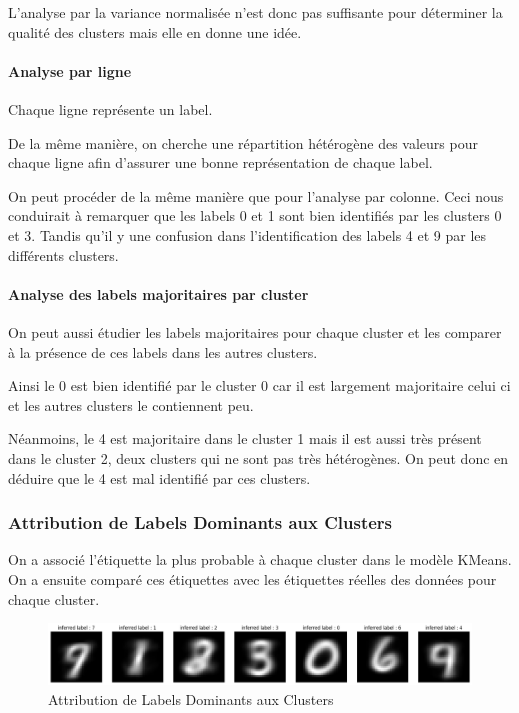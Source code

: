 \documentclass[french,a4paper,18pt]{article}
\begin{document}
L'analyse par la variance normalisée n'est donc pas suffisante pour déterminer la qualité des clusters mais 
elle en donne une idée.

\paragraph{Analyse par ligne} 
Chaque ligne représente un label.

De la même manière, on cherche une répartition hétérogène des valeurs pour chaque ligne
afin d'assurer une bonne représentation de chaque label.

On peut procéder de la même manière que pour l'analyse par colonne. 
Ceci nous conduirait à remarquer que les labels 0 et 1 sont bien identifiés
par les clusters 0 et 3.
Tandis qu'il y une confusion dans l'identification des labels 4 et 9 par les différents clusters.

\paragraph{Analyse des labels majoritaires par cluster} 

On peut aussi étudier les labels majoritaires pour chaque cluster 
et les comparer à la présence de ces labels dans les autres clusters.

Ainsi le 0 est bien identifié par le cluster 0 car il est largement majoritaire celui ci 
et les autres clusters le contiennent peu.

Néanmoins, le 4 est majoritaire dans le cluster 1 mais il est aussi très présent dans le cluster 2,
deux clusters qui ne sont pas très hétérogènes.
On peut donc en déduire que le 4 est mal identifié par ces clusters.

\subsubsection{Attribution de Labels Dominants aux Clusters}

On a associé l'étiquette la plus probable à chaque cluster dans le modèle KMeans.
On a ensuite comparé ces étiquettes avec les étiquettes réelles des données pour chaque cluster.

\begin{figure}[h!]
    \centering
    \includegraphics[scale=0.2]{images/mnist_kmeans_inferred_labels.png}
    \caption{Attribution de Labels Dominants aux Clusters}\label{fig:mnist_kmeans_labels}
\end{figure}
\end{document}
